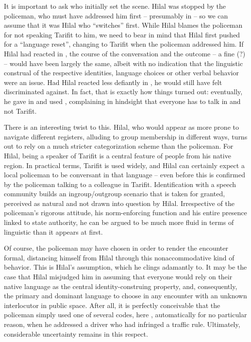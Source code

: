 \documentclass[output=paper,colorlinks,citecolor=brown]{langscibook}
\begin{document}
It is important to ask who initially set the scene. Hilal was stopped by the policeman, who must have addressed him first -- presumably in  -- so we can assume that it was Hilal who ``switches'' first. While Hilal blames the policeman for not speaking Tarifit to him, we need to bear in mind that Hilal first pushed for a ``language reset'', changing to Tarifit when the policeman addressed him. If Hilal had reacted in , the course of the conversation and the outcome -- a fine (?) -- would have been largely the same, albeit with no indication that the linguistic construal of the respective identities, language choices or other verbal behavior were an issue. Had Hilal reacted less defiantly in , he would still have felt discriminated against. In fact, that is exactly how things turned out: eventually, he gave in and used , complaining in hindsight that everyone has to talk in  and not Tarifit. 

There is an interesting twist to this. Hilal, who would appear as more prone to navigate different registers, alluding to group membership in different ways, turns out to rely on a much stricter categorization scheme than the policeman. For Hilal, being a speaker of Tarifit is a central feature of people from his native region. In practical terms, Tarifit is used widely, and Hilal can certainly expect a local policeman to be conversant in that language -- even before this is confirmed by the policeman talking to a colleague in Tarifit. Identification with a speech community builds an ingroup/outgroup scenario that is taken for granted, perceived as natural and not drawn into question by Hilal. Irrespective of the policeman's rigorous attitude, his norm-enforcing function and his entire presence linked to state authority, he can be argued to be much more fluid in terms of linguistic  than it appears at first. 

Of course, the policeman may have chosen  in order to render the encounter formal, distancing himself from Hilal through this nonaccommodative kind of behavior. This is Hilal's assumption, which he clings adamantly to. It may be the case that Hilal misjudged him in assuming that everyone would rely on their native language as the central identity-construing property, and, consequently, the primary and dominant language to choose in any encounter with an unknown interlocutor in public space. After all, it is perfectly conceivable that the policeman simply used one of several codes, here , automatically for no particular reason, when he addressed a driver who had infringed a traffic rule. Ultimately, considerable uncertainty remains in this respect.
\end{document}
